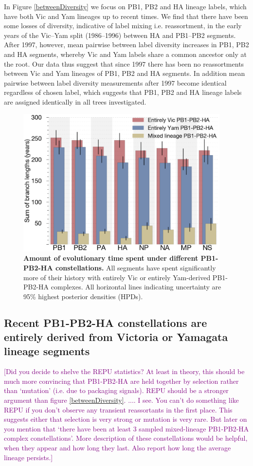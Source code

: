 \documentclass[11pt,oneside,letterpaper]{article}
\def\tbc#1{\textcolor{purple}{[#1]}}
\begin{document}
In Figure \ref{betweenDiversity} we focus on PB1, PB2 and HA lineage labels, which have both Vic and Yam lineages up to recent times.
We find that there have been some losses of diversity, indicative of label mixing i.e. reassortment, in the early years of the Vic--Yam split (1986--1996) between HA and PB1--PB2 segments.
After 1997, however, mean pairwise between label diversity increases in PB1, PB2 and HA segments, whereby Vic and Yam labels share a common ancestor only at the root.
Our data thus suggest that since 1997 there has been no reassortments between Vic and Yam lineages of PB1, PB2 and HA segments.
In addition mean pairwise between label diversity measurements after 1997 become identical regardless of chosen label, which suggests that PB1, PB2 and HA lineage labels are assigned identically in all trees investigated.

\begin{figure}[h]
	\centering		
	\includegraphics[width=0.95\textwidth]{figures/InfB_stateTime.png}
	\caption{\textbf{Amount of evolutionary time spent under different PB1-PB2-HA constellations.}
All segments have spent significantly more of their history with entirely Vic or entirely Yam-derived PB1-PB2-HA complexes.
All horizontal lines indicating uncertainty are 95\% highest posterior densities (HPDs).}
	\label{stateTime}
\end{figure}


\subsection*{Recent PB1-PB2-HA constellations are entirely derived from Victoria or Yamagata lineage segments}

\tbc{Did you decide to shelve the REPU statistics?  At least in theory, this should be much more convincing that PB1-PB2-HA are held together by selection rather than `mutation' (i.e. due to packaging signals).  REPU should be a stronger argument than figure \ref{betweenDiversity}. .... I see.  You can't do something like REPU if you don't observe any transient reassortants in the first place.  This suggests either that selection is very strong or mutation is very rare.  But later on you mention that `there have been at least 3 sampled mixed-lineage PB1-PB2-HA complex constellations'.  More description of these constellations would be helpful, when they appear and how long they last.  Also report how long the average lineage persists.}
\end{document}

